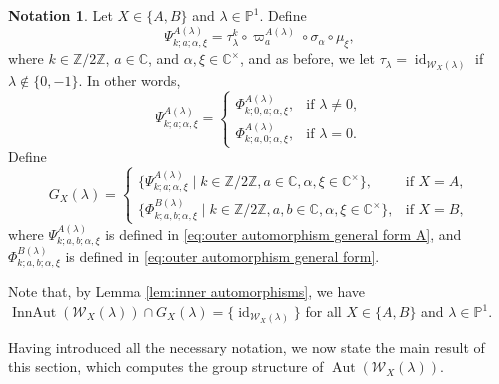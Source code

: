 \documentclass[11pt, svgnames]{amsart}
\newcommand{\ZZ}{\mathbb{Z}}
\newcommand{\CC}{\mathbb{C}}
\newcommand{\PP}{\mathbb{P}}
\newcommand{\W}{\mathcal{W}}
\DeclareMathOperator{\id}{id}
\DeclareMathOperator{\Aut}{Aut}
\DeclareMathOperator{\InnAut}{InnAut}
\theoremstyle{definition}
\newtheorem{Notation}[proposition]{Notation}
\begin{document}
\begin{Notation}\label{ntt:outer automorphism group}
    Let $X \in \{A,B\}$ and $\lambda \in \PP^1$. Define
    \begin{equation}\label{eq:outer automorphism general form A}
        \Psi_{k;a;\alpha,\xi}^{A(\lambda)} = \tau_\lambda^k \circ \varpi_a^{A(\lambda)} \circ \sigma_\alpha \circ \mu_\xi,
    \end{equation}
    where $k \in \ZZ/2\ZZ$, $a \in \CC$, and $\alpha, \xi \in \CC^\times$, and as before, we let $\tau_\lambda = \id_{\W_X(\lambda)}$ if $\lambda \notin \{0,-1\}$. In other words,
    $$\Psi_{k;a;\alpha,\xi}^{A(\lambda)} = \begin{cases}
        \Phi_{k;0,a;\alpha,\xi}^{A(\lambda)}, &\text{if } \lambda \neq 0, \\
        \Phi_{k;a,0;\alpha,\xi}^{A(\lambda)}, &\text{if } \lambda = 0.
    \end{cases}$$
    Define 
    $$G_X(\lambda) = \begin{cases}
        \{\Psi_{k;a;\alpha,\xi}^{A(\lambda)} \mid k \in \ZZ/2\ZZ, a \in \CC, \alpha, \xi \in \CC^\times\}, &\text{if } X = A, \\
        \{\Phi_{k;a,b;\alpha,\xi}^{B(\lambda)} \mid k \in \ZZ/2\ZZ, a,b \in \CC, \alpha, \xi \in \CC^\times\}, &\text{if } X = B,
    \end{cases}$$
    where $\Psi_{k;a,b;\alpha,\xi}^{A(\lambda)}$ is defined in \eqref{eq:outer automorphism general form A}, and $\Phi_{k;a,b;\alpha,\xi}^{B(\lambda)}$ is defined in \eqref{eq:outer automorphism general form}.
\end{Notation}

Note that, by Lemma \ref{lem:inner automorphisms}, we have $\InnAut(\W_X(\lambda)) \cap G_X(\lambda) = \{\id_{\W_X(\lambda)}\}$ for all $X \in \{A,B\}$ and $\lambda \in \PP^1$.

Having introduced all the necessary notation, we now state the main result of this section, which computes the group structure of $\Aut(\W_X(\lambda))$.
\end{document}
